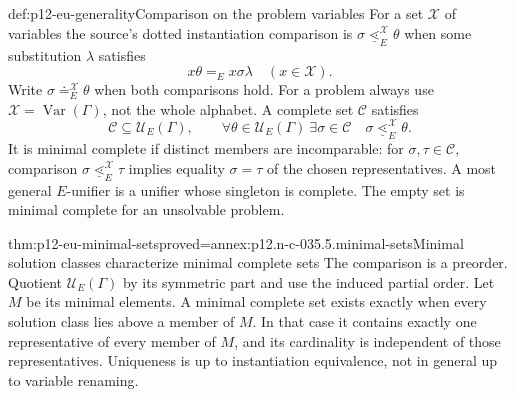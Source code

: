 \begin{hbdefinition}{def:p12-eu-generality}{Comparison on the problem variables}
For a set \(\mathcal X\) of variables the source's dotted instantiation
comparison is \(\sigma\mathrel{\underline{\lessdot}}_E^{\mathcal X}\theta\) when some
substitution \(\lambda\) satisfies
\[
                       x\theta=_E x\sigma\lambda\quad(x\in\mathcal X).
\]
Write \(\sigma\doteq_E^{\mathcal X}\theta\) when both comparisons
hold. For a problem always use \(\mathcal X=\operatorname{Var}(\Gamma)\),
not the whole alphabet. A complete set \(\mathcal C\) satisfies
\[
 \mathcal C\subseteq\mathcal U_E(\Gamma),\qquad
 \forall\theta\in\mathcal U_E(\Gamma)\ \exists\sigma\in\mathcal C\quad
                  \sigma\mathrel{\underline{\lessdot}}_E^{\mathcal X}\theta.
\]
It is minimal complete if distinct members are incomparable: for
\(\sigma,\tau\in\mathcal C\), comparison
\(\sigma\mathrel{\underline{\lessdot}}_E^{\mathcal X}\tau\)
implies equality \(\sigma=\tau\) of the chosen representatives.
A most general \(E\)-unifier is a unifier whose singleton is complete.
The empty set is minimal complete for an unsolvable problem.
\cite[Definitions 3.2--3.3, pp.~470--471]{BaaderSnyder2001}
\end{hbdefinition}

\begin{hbtheorem}{thm:p12-eu-minimal-sets}{proved=annex:p12.n-c-035.5.minimal-sets}{Minimal solution classes characterize minimal complete sets}
The comparison is a preorder. Quotient \(\mathcal U_E(\Gamma)\) by its symmetric
part and use the induced partial order. Let \(M\) be its minimal elements.
A minimal complete set exists exactly when every solution class lies above
a member of \(M\). In that case it contains exactly one representative
of every member of \(M\), and its cardinality is independent of those
representatives. Uniqueness is up to instantiation equivalence, not in
general up to variable renaming.
\cite[Lemmas 3.10--3.11, Theorem 3.12, Corollary 3.13, pp.~475--477]{BaaderSnyder2001}
\end{hbtheorem}

